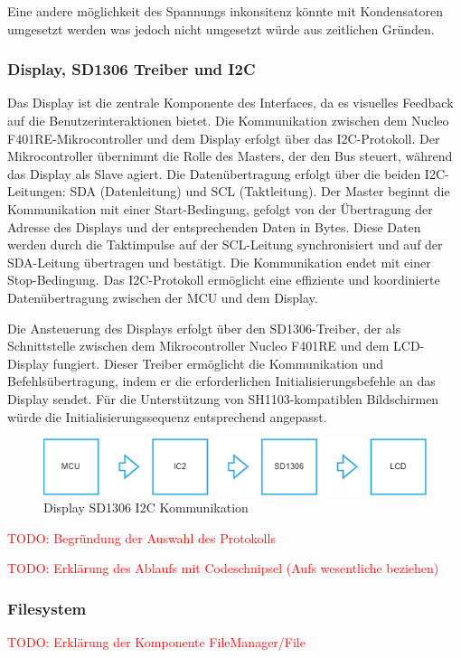Eine andere möglichkeit des Spannungs inkonsitenz könnte mit Kondensatoren umgesetzt werden was jedoch nicht umgesetzt würde aus zeitlichen Gründen.

\subsubsection{Display, SD1306 Treiber und I2C}

Das Display ist die zentrale Komponente des Interfaces, da es visuelles Feedback auf die Benutzerinteraktionen bietet. Die Kommunikation zwischen dem Nucleo F401RE-Mikrocontroller und dem Display erfolgt über das I2C-Protokoll. Der Mikrocontroller übernimmt die Rolle des Masters, der den Bus steuert, während das Display als Slave agiert. Die Datenübertragung erfolgt über die beiden I2C-Leitungen: SDA (Datenleitung) und SCL (Taktleitung). Der Master beginnt die Kommunikation mit einer Start-Bedingung, gefolgt von der Übertragung der Adresse des Displays und der entsprechenden Daten in Bytes. Diese Daten werden durch die Taktimpulse auf der SCL-Leitung synchronisiert und auf der SDA-Leitung übertragen und bestätigt. Die Kommunikation endet mit einer Stop-Bedingung. Das I2C-Protokoll ermöglicht eine effiziente und koordinierte Datenübertragung zwischen der MCU und dem Display.

Die Ansteuerung des Displays erfolgt über den SD1306-Treiber, der als Schnittstelle zwischen dem Mikrocontroller Nucleo F401RE und dem LCD-Display fungiert. Dieser Treiber ermöglicht die Kommunikation und Befehlsübertragung, indem er die erforderlichen Initialisierungsbefehle an das Display sendet. Für die Unterstützung von SH1103-kompatiblen Bildschirmen würde die Initialisierungssequenz entsprechend angepasst.


\begin{figure}[H]
	\centering
	\includegraphics[width=1.0\textwidth]{images/08_durchfuehrung/interface/Display SD1306 Treiber I2C.drawio}
	\caption{Display SD1306 I2C Kommunikation}
	\label{fig:Display SD1306 I2C}
\end{figure}

\newpage

\textcolor{red}{TODO: Begründung der Auswahl des Protokolls}

\textcolor{red}{TODO: Erklärung des Ablaufs mit Codeschnipsel (Aufs wesentliche beziehen)}



\subsubsection{Filesystem}

\textcolor{red}{TODO: Erklärung der Komponente FileManager/File}





